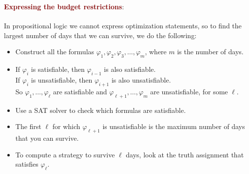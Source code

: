 \vspace{1cm}

{\Large \textbf{\textcolor{Maroon}{Expressing the budget restrictions}}:} \\
\\
In propositional logic we cannot express optimization statements, so to find the largest number of days that we can survive, we do the following:
\begin{itemize}
    \setlength\itemsep{0em}
    \item Construct all the formulas $\varphi_{1}, \varphi_{2}, \varphi_{3}, \ldots, \varphi_{m}$, where $m$ is the number of days.
    \item If $\varphi_{i}$ is satisfiable, then $\varphi_{i-1}$ is also satisfiable. \\
    If $\varphi_{i}$ is unsatisfiable, then $\varphi_{i+1}$ is also unsatisfiable. \\
    So $\varphi_{1}, \ldots, \varphi_{\ell}$ are satisfiable and $\varphi_{\ell+1}, \ldots, \varphi_{m}$ are unsatisfiable, for some $\ell$.
    \item Use a SAT solver to check which formulas are satisfiable.
    \item The first $\ell$ for which $\varphi_{\ell+1}$ is unsatisfiable is the maximum number of days that you can survive.
    \item To compute a strategy to survive $\ell$ days, look at the truth assignment that satisfies $\varphi_{\ell}$.
\end{itemize}